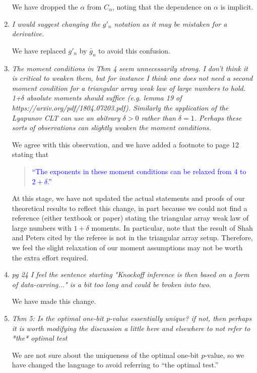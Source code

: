 \documentclass[12pt]{article}
\begin{document}
\begin{enumerate}
	We have dropped the $\alpha$ from $C_\alpha$, noting that the dependence on $\alpha$ is implicit.

	\item \textsl{I would suggest changing the $g'_n$ notation as it may be mistaken for a derivative.}
	
	We have replaced $g'_n$ by $\bar g_n$ to avoid this confusion.

	\item \textsl{The moment conditions in Thm 4 seem unnecessarily strong. I don't think it is critical to weaken them, but for instance I think one does not need a second moment condition for a triangular array weak law of large numbers to hold. 1+$\delta$ absolute moments should suffice (e.g. lemma 19 of https://arxiv.org/pdf/1804.07203.pdf). Similarly the application of the Lyapunov CLT can use an abitrary $\delta > 0$ rather than $\delta=1$. Perhaps these sorts of observations can slightly weaken the moment conditions.}
	
	We agree with this observation, and we have added a footnote to page 12 stating that
	\begin{quote}
	\textcolor{blue}{``The exponents in these moment conditions can be relaxed from 4 to $2+\delta$.''}
	\end{quote}
	At this stage, we have not updated the actual statements and proofs of our theoretical results to reflect this change, in part because we could not find a reference (either textbook or paper) stating the triangular array weak law of large numbers with $1+\delta$ moments. In particular, note that the result of Shah and Peters cited by the referee is not in the triangular array setup. Therefore, we feel the slight relaxation of our moment assumptions may not be worth the extra effort required. %

	\item \textsl{pg 24 I feel the sentence starting "Knockoff inference is then based on a form of data-carving..." is a bit too long and could be broken into two.}
	
	We have made this change. 

	\item \textsl{Thm 5: Is the optimal one-bit p-value essentially unique? if not, then perhaps it is worth modifying the discussion a little here and elsewhere to not refer to *the* optimal test}
	
	We are not sure about the uniqueness of the optimal one-bit $p$-value, so we have changed the language to avoid referring to ``the optimal test.''

\end{enumerate}
\end{document}
